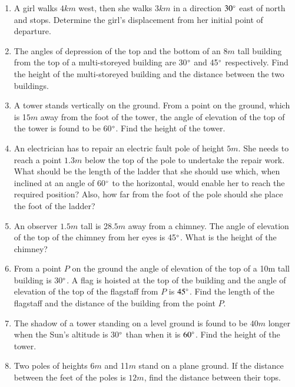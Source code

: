 \begin{enumerate}[label=\thesubsection.\arabic*.,ref=\thesubsection.\theenumi]
\item A girl walks $4km$ west, then she walks $3km$ in a direction $30\degree$ east of north and stops.  Determine the girl's displacement from her initial point of departure.
\item The angles of depression of the top and the bottom of an $8m$ tall building from the top of a multi-storeyed building are 30$\degree$ and 45$\degree$ respectively.  Find the height of the multi-storeyed building and the distance between the two buildings.
\item A tower stands vertically on the ground.  From a point on the ground, which is 1$5m$ away from the foot of the tower, the angle of elevation of the top of the tower is found to be 60$\degree$.  Find the height of the tower.
\item An electrician has to repair an electric fault pole of height $5m$.  She needs to reach a point $1.3m$ below the top of the pole to undertake the repair work.  What should be the length of the ladder that she should use which, when inclined at an angle of 60$\degree$ to the horizontal, would enable her to reach the required position?  Also, how far from the foot of the pole should she place the foot of the ladder?
\item An observer $1.5m$ tall is 28.$5m$ away from a chimney.  The angle of elevation of the top of the chimney from her eyes is 45$\degree$.  What is the height of the chimney?
\item From a point ${P}$ on the ground the angle of elevation of the top of a 10m tall building is 30$\degree$.  A flag is hoisted at the top of the building and the angle of elevation of the top of the flagstaff from ${P}$ is $45\degree$.  Find the length of the flagstaff and the distance of the building from the point ${P}$.
\item The shadow of a tower standing on a level ground is found to be $40m$ longer when the Sun's altitude is 30$\degree$ than when it is $60\degree$.  Find the height of the tower.
\item  Two poles of heights 6$m$ and 11$m$ stand on a plane ground. If the distance between the feet of the poles is $12m$, find the distance between their tops.
\end{enumerate}
